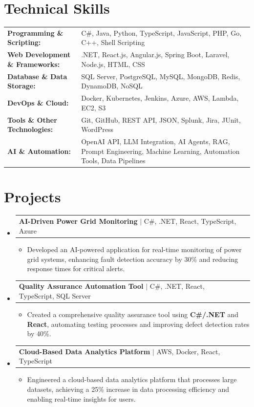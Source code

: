 \documentclass[letterpaper,10pt]{article}
\makeatletter
\newcommand{\resumeItem}[1]{
  \item{\fontsize{8pt}{9pt}\selectfont
    #1 \vspace{-3pt}
  }
}
\newcommand{\resumeProjectHeading}[2]{
    \item
    \begin{tabular*}{1.001\textwidth}{l@{\extracolsep{\fill}}r}
      \fontsize{8.5pt}{10pt}#1 & \textbf{\fontsize{8.5pt}{10pt} #2}\\
    \end{tabular*}\vspace{-7pt}
}
\newcommand{\resumeSubHeadingListStart}{\begin{itemize}[leftmargin=0pt, label={}]}
\newcommand{\resumeSubHeadingListEnd}{\end{itemize}}
\newcommand{\resumeItemListStart}{\begin{itemize}[leftmargin=*]}
\newcommand{\resumeItemListEnd}{\end{itemize}\vspace{-5pt}}
\makeatother
\begin{document}
\section{Technical Skills}
        \vspace{-14pt}
        \begin{table}[h]
            \fontsize{8pt}{9pt}\selectfont
            \begin{tabular}{p{0.3\linewidth} p{0.7\linewidth}}
                \textbf{Programming \& Scripting:} & C\#, Java, Python, TypeScript, JavaScript, PHP, Go, C++, Shell Scripting \\
                \textbf{Web Development \& Frameworks:} & .NET, React.js, Angular.js, Spring Boot, Laravel, Node.js, HTML, CSS \\
                \textbf{Database \& Data Storage:} & SQL Server, PostgreSQL, MySQL, MongoDB, Redis, DynamoDB, NoSQL \\
                \textbf{DevOps \& Cloud:} & Docker, Kubernetes, Jenkins, Azure, AWS, Lambda, EC2, S3 \\
                \textbf{Tools \& Other Technologies:} & Git, GitHub, REST API, JSON, Splunk, Jira, JUnit, WordPress \\
                \textbf{AI \& Automation:} & OpenAI API, LLM Integration, AI Agents, RAG, Prompt Engineering, Machine Learning, Automation Tools, Data Pipelines \\
            \end{tabular}
        \end{table}
 \vspace{-18pt}

\section{Projects}
    \vspace{-5pt}
    \resumeSubHeadingListStart
          \resumeProjectHeading
            {\textbf{AI-Driven Power Grid Monitoring} $|$ C\#, .NET, React, TypeScript, Azure}{}
            \resumeItemListStart
                \resumeItem{Developed an AI-powered application for real-time monitoring of power grid systems, enhancing fault detection accuracy by 30\% and reducing response times for critical alerts.}
            \resumeItemListEnd
        \vspace{-12pt}
    
        \resumeProjectHeading
            {\textbf{Quality Assurance Automation Tool} $|$ C\#, .NET, React, TypeScript, SQL Server}{}
        \resumeItemListStart
                \resumeItem{Created a comprehensive quality assurance tool using \textbf{C\#/.NET} and \textbf{React}, automating testing processes and improving defect detection rates by 40\%.}
        \resumeItemListEnd
      \vspace{-12pt}
      \resumeProjectHeading
        {\textbf{Cloud-Based Data Analytics Platform} $|$ AWS, Docker, React, TypeScript}{}
    \resumeItemListStart
            \resumeItem{Engineered a cloud-based data analytics platform that processes large datasets, achieving a 25\% increase in data processing efficiency and enabling real-time insights for users.}
    \resumeItemListEnd
    \resumeSubHeadingListEnd
\end{document}
